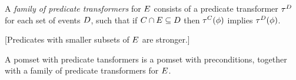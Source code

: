 \begin{definition}
  A \emph{family of predicate transformers}
  for $\aEvs$
  consists of a predicate transformer
  $\aTr[\bEvs]$ for each set of events $\bEvs$,
  such that if $\cEvs \cap \aEvs \subseteq \bEvs$
  then $\aTr[\cEvs](\aForm)$ implies $\aTr[\bEvs](\aForm)$.
\end{definition}

[Predicates with smaller subsets of $\aEvs$ are stronger.]

\begin{definition}
  A pomset with predicate tansformers is a pomset with preconditions,
  together with a family of predicate transformers for $\aEvs$.
\end{definition}


